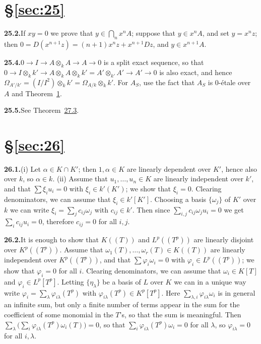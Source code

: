 
\section*{\S\ref{sec:25}}

\noindent\textbf{25.2.}\quad If $xy = 0$ we prove that $y \in \bigcap_n x^nA$; suppose that $y \in x^nA$,
and set $y = x^nz$; then $0 = D(x^{n+1}z) = (n + 1)x^nz + x^{n+1}Dz$, and
$y \in x^{n+1}A$.

\noindent\textbf{25.4.}\quad $0 \to I \to A \otimes_k A \to A \to 0$ is a split exact sequence, so that
$0 \to I \otimes_k k' \to A \otimes_k A \otimes_k k' = A' \otimes_{k'} A' \to A' \to 0$ is also
exact, and hence $\Omega_{A'/k'} = (I/I^2) \otimes_k k' = \Omega_{A/k} \otimes_k k'$. For $A_S$, use the
fact that $A_S$ is 0-\'etale over $A$ and Theorem~\hyperref[thm:25.1]{1}.

\noindent\textbf{25.5.}\quad See Theorem~\hyperref[thm:27.3]{27.3}.

\section*{\S\ref{sec:26}}

\noindent\textbf{26.1.}\quad (i) Let $\alpha \in K \cap K'$; then $1, \alpha \in K$ are linearly dependent over
$K'$, hence also over $k$, so $\alpha \in k$. (ii) Assume that $u_1, \ldots, u_n \in K$ are
linearly independent over $k'$, and that $\sum \xi_iu_i = 0$ with
$\xi_i \in k'(K')$; we show that $\xi_i = 0$. Clearing denominators, we can assume
that $\xi_i \in k'[K']$. Choosing a basis $\{\omega_j\}$ of $K'$ over $k$ we can write
$\xi_i = \sum_j c_{ij}\omega_j$ with $c_{ij} \in k'$. Then since
$\sum_{i,j}c_{ij}\omega_ju_i = 0$ we get $\sum_i c_{ij}u_i = 0$, therefore
$c_{ij} = 0$ for all $i, j$.

\noindent\textbf{26.2.}\quad It is enough to show that $K((T))$ and $L^p((T^p))$ are linearly
disjoint over $K^p((T^p))$. Assume that $\omega_1(T), \ldots, \omega_r(T) \in K((T))$ are
linearly independent over $K^p((T^p))$, and that $\sum \varphi_i\omega_i = 0$ with
$\varphi_i \in L^p((T^p))$; we show that $\varphi_i = 0$ for all $i$. Clearing
denominators, we can assume that $\omega_i \in K[T]$ and
$\varphi_i \in L^p[T^p]$. Letting $\{\eta_\lambda\}$ be a basis of $L$ over $K$ we can in a
unique way write $\varphi_i = \sum_\lambda \varphi_{i\lambda}(T^p)$ with
$\varphi_{i\lambda}(T^p) \in K^p[T^p]$. Here $\sum_{\lambda,i}\varphi_{i\lambda}\omega_i$ is in
general an infinite sum, but only a finite number of terms appear in the sum
for the coefficient of some monomial in the $T$'s, so that the sum is
meaningful. Then $\sum_\lambda\big(\sum_i \varphi_{i\lambda}(T^p)\omega_i(T)\big) = 0$, so that
$\sum_i \varphi_{i\lambda}(T^p)\omega_i = 0$ for all $\lambda$, so
$\varphi_{i\lambda} = 0$ for all $i, \lambda$.
